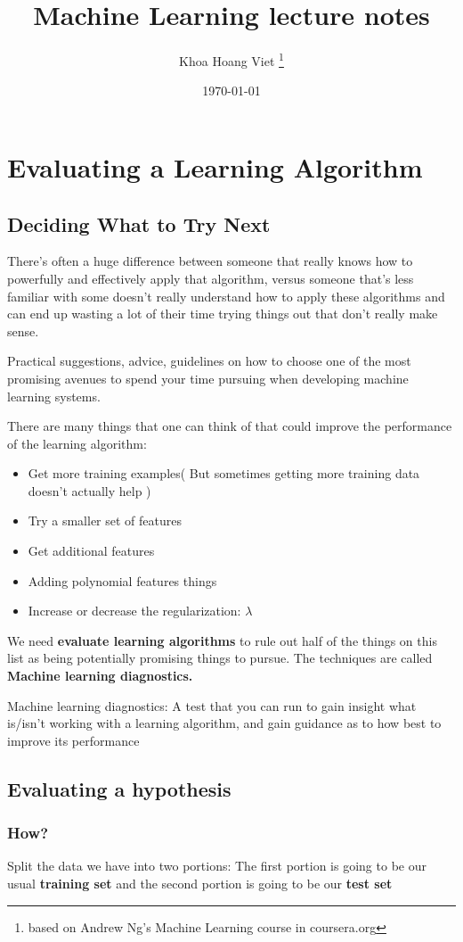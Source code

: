\documentclass{article}
\title{Machine Learning lecture notes}
\author{Khoa Hoang Viet \thanks{based on Andrew Ng's Machine Learning course in coursera.org}}
\date{\today}
\begin{document}
\section{Evaluating a Learning Algorithm}
\subsection{Deciding What to Try Next}
There's often a huge difference between someone that really knows how to powerfully and effectively apply that algorithm, versus someone that's less familiar with some  doesn't really understand how to apply these algorithms and can end up wasting a lot of their time trying things out that don't really make sense.

Practical suggestions, advice, guidelines on how to choose one of the most promising avenues to spend your time pursuing when developing machine learning systems.

There are many things that one can think of that could improve the performance of the learning algorithm:
\begin{itemize}
	\item Get more training examples( But sometimes getting more training data doesn't actually help )
	\item Try a smaller set of features
	\item Get additional features
	\item Adding polynomial features things
	\item Increase or decrease the regularization: $\lambda$
\end{itemize}

We need \textbf{evaluate learning algorithms} to rule out half of the things on this list as being potentially promising things to pursue. The techniques are called \textbf{Machine learning diagnostics.}

Machine learning diagnostics: A test that you can run to gain insight what is/isn’t working with a learning algorithm, and gain guidance as to how best to improve its performance

\subsection{Evaluating a hypothesis}
\subsubsection{How?}
Split the data we have into two portions: The first portion is going to be our usual \textbf{training set} and the second portion is going to be our \textbf{test set}
\end{document}
